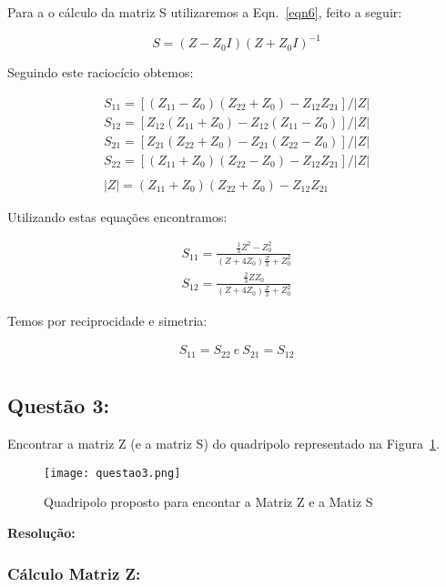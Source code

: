 \documentclass[a4paper,12pt]{proc}
\begin{document}
\noindent Para a o cálculo da matriz S utilizaremos a Eqn.~\ref{eqn6}, feito a seguir:

\[S = (Z - Z_{0}I)(Z + Z_{0}I)^{-1}\]

\noindent Seguindo este raciocício obtemos:

\begin{align*}
    S_{11} = [(Z_{11} - Z_{0})(Z_{22}+Z_{0})-Z_{12}Z_{21}]/\left | Z \right | \\             
    S_{12} = [Z_{12}(Z_{11} + Z_{0}) - Z_{12}(Z_{11} - Z_{0})]/\left | Z \right | \\
    S_{21} = [Z_{21}(Z_{22}+Z_{0}) - Z_{21}(Z_{22}-Z_{0})]/\left | Z \right | \\
    S_{22} = [(Z_{11}+Z_{0})(Z_{22}-Z_{0}) - Z_{12}Z_{21}]/\left | Z \right | \\
    ~ \\
    \left | Z \right | = (Z_{11} + Z_{0})(Z_{22}+Z_{0}) - Z_{12}Z_{21}
\end{align*}

\noindent Utilizando estas equações encontramos:

\begin{align*}
    S_{11} = \frac{\frac{1}{3}Z^{2} - Z_{0}^{2}}{(Z + 4Z_{0})\frac{Z}{3}+Z_{0}^{2}} \\             
    S_{12} = \frac{\frac{2}{3}ZZ_{0}}{(Z + 4Z_{0})\frac{Z}{3}+Z_{0}^{2}}
\end{align*}

Temos por reciprocidade e simetria:

\begin{align*}
    S_{11} = S_{22} ~e~  S_{21} = S_{12}\\
\end{align*}

\subsection{Questão 3:}

Encontrar a matriz Z (e a matriz S) do quadripolo representado na Figura~\ref{quest3}.

\begin{figure}[htbt]
    \centering
    \texttt{[image: questao3.png]}
    \caption{Quadripolo proposto para encontar a Matriz Z e a Matiz S}
    \label{quest3}
\end{figure}

\textbf{Resolução:}

\subsubsection{Cálculo Matriz Z:}
\end{document}

